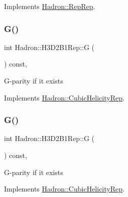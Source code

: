Implements \mbox{\hyperlink{structHadron_1_1RepRep_a92c8802e5ed7afd7da43ccfd5b7cd92b}{Hadron\+::\+Rep\+Rep}}.

\mbox{\label{structHadron_1_1H3D2B1Rep_a7870acf492c1acb514530f17633f7f6d}} 
\subsubsection{\texorpdfstring{G()}{G()}\hspace{0.1cm}{\footnotesize\ttfamily [1/3]}}
{\footnotesize\ttfamily int Hadron\+::\+H3\+D2\+B1\+Rep\+::G (\begin{DoxyParamCaption}{ }\end{DoxyParamCaption}) const\hspace{0.3cm}{\ttfamily [inline]}, {\ttfamily [virtual]}}

G-\/parity if it exists 

Implements \mbox{\hyperlink{structHadron_1_1CubicHelicityRep_a50689f42be1e6170aa8cf6ad0597018b}{Hadron\+::\+Cubic\+Helicity\+Rep}}.

\mbox{\label{structHadron_1_1H3D2B1Rep_a7870acf492c1acb514530f17633f7f6d}} 
\subsubsection{\texorpdfstring{G()}{G()}\hspace{0.1cm}{\footnotesize\ttfamily [2/3]}}
{\footnotesize\ttfamily int Hadron\+::\+H3\+D2\+B1\+Rep\+::G (\begin{DoxyParamCaption}{ }\end{DoxyParamCaption}) const\hspace{0.3cm}{\ttfamily [inline]}, {\ttfamily [virtual]}}

G-\/parity if it exists 

Implements \mbox{\hyperlink{structHadron_1_1CubicHelicityRep_a50689f42be1e6170aa8cf6ad0597018b}{Hadron\+::\+Cubic\+Helicity\+Rep}}.

\mbox{\label{structHadron_1_1H3D2B1Rep_a7870acf492c1acb514530f17633f7f6d}} 
